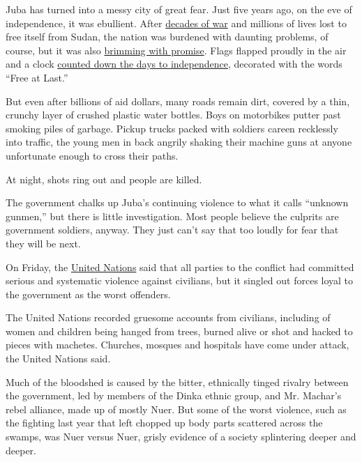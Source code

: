 Juba has turned into a messy city of great fear. Just five years ago, on
the eve of independence, it was ebullient. After
\href{http://www.nytimes3xbfgragh.onion/2011/01/09/world/africa/09sudan.html?pagewanted=all}{decades
of war} and millions of lives lost to free itself from Sudan, the nation
was burdened with daunting problems, of course, but it was also
\href{http://www.nytimes3xbfgragh.onion/2011/01/10/world/africa/10sudan.html}{brimming
with promise}. Flags flapped proudly in the air and a clock
\href{http://www.nytimes3xbfgragh.onion/2011/07/08/world/africa/08sudan.html}{counted
down the days to independence}, decorated with the words ``Free at
Last.''

But even after billions of aid dollars, many roads remain dirt, covered
by a thin, crunchy layer of crushed plastic water bottles. Boys on
motorbikes putter past smoking piles of garbage. Pickup trucks packed
with soldiers careen recklessly into traffic, the young men in back
angrily shaking their machine guns at anyone unfortunate enough to cross
their paths.

At night, shots ring out and people are killed.

The government chalks up Juba's continuing violence to what it calls
``unknown gunmen,'' but there is little investigation. Most people
believe the culprits are government soldiers, anyway. They just can't
say that too loudly for fear that they will be next.

On Friday, the
\href{http://www.nytimes3xbfgragh.onion/2016/03/12/world/africa/un-reports-systematic-rape-in-south-sudan-conflict.html?hp\&action=click\&pgtype=Homepage\&clickSource=story-heading\&module=first-column-region\&region=top-news\&WT.nav=top-news}{United
Nations} said that all parties to the conflict had committed serious and
systematic violence against civilians, but it singled out forces loyal
to the government as the worst offenders.

The United Nations recorded gruesome accounts from civilians, including
of women and children being hanged from trees, burned alive or shot and
hacked to pieces with machetes. Churches, mosques and hospitals have
come under attack, the United Nations said.

Much of the bloodshed is caused by the bitter, ethnically tinged rivalry
between the government, led by members of the Dinka ethnic group, and
Mr. Machar's rebel alliance, made up of mostly Nuer. But some of the
worst violence, such as the fighting last year that left chopped up body
parts scattered across the swamps, was Nuer versus Nuer, grisly evidence
of a society splintering deeper and deeper.

